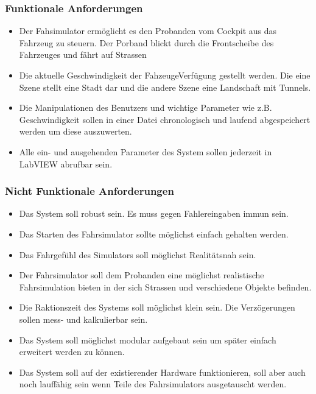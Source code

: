 \subsubsection{Funktionale Anforderungen}
\begin{itemize}
\item Der Fahsimulator ermöglicht es den Probanden vom Cockpit aus das Fahrzeug zu steuern. Der Porband blickt durch die Frontscheibe des Fahrzeuges und fährt auf Strassen
\item Die aktuelle Geschwindigkeit der FahzeugeVerfügung gestellt werden.  Die eine Szene stellt eine Stadt dar und die andere Szene eine Landschaft mit Tunnels.
\item Die Manipulationen des Benutzers und wichtige Parameter wie z.B. Geschwindigkeit sollen in einer Datei chronologisch und laufend abgespeichert werden um diese auszuwerten.
\item Alle ein- und ausgehenden Parameter des System sollen jederzeit in LabVIEW abrufbar sein.
\end{itemize}

\subsubsection {Nicht Funktionale Anforderungen}
\renewcommand{\labelenumi}{\alph{enumi})}

\begin{itemize}
\item Das System soll robust sein. Es muss gegen Fahlereingaben immun sein. 
\item Das Starten des Fahrsimulator sollte möglichst einfach gehalten werden.
\item Das Fahrgefühl des Simulators soll möglichst Realitätsnah sein.  
\item Der Fahrsimulator soll dem Probanden eine möglichst realistische Fahrsimulation bieten in der sich Strassen und verschiedene Objekte befinden.
\item Die Raktionszeit des Systems soll möglichst klein sein. Die Verzögerungen sollen mess-  und kalkulierbar sein.
\item Das System soll möglichst modular aufgebaut sein um später einfach erweitert werden zu können.
\item Das System soll auf der existierender Hardware funktionieren, soll aber auch noch lauffähig sein wenn Teile des Fahrsimulators ausgetauscht werden. 
\end{itemize}
